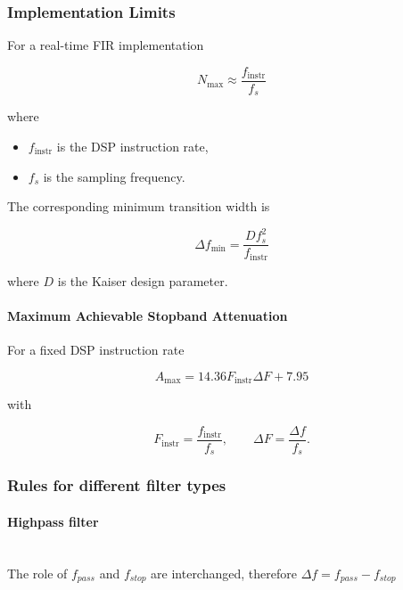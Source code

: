 \subsubsection{Implementation Limits}

For a real-time FIR implementation

\[
N_{\max}
\approx
\frac{f_{\mathrm{instr}}}{f_s}
\]

where

\begin{itemize}
\item $f_{\mathrm{instr}}$ is the DSP instruction rate,
\item $f_s$ is the sampling frequency.
\end{itemize}

The corresponding minimum transition width is

\[
\boxed{
\Delta f_{\min}
=
\frac{Df_s^2}
{f_{\mathrm{instr}}}
}
\]

where $D$ is the Kaiser design parameter.

\paragraph{Maximum Achievable Stopband Attenuation}

For a fixed DSP instruction rate

\[
\boxed{
A_{\max}
=
14.36
F_{\mathrm{instr}}
\Delta F
+
7.95
}
\]

with

\[
F_{\mathrm{instr}}
=
\frac{f_{\mathrm{instr}}}{f_s},
\qquad
\Delta F
=
\frac{\Delta f}{f_s}.
\]

\subsubsection{Rules for different filter types}
\paragraph{Highpass filter}~\\
The role of $f_{pass}$ and $f_{stop}$ are interchanged, therefore $\Delta f = f_{pass}-f_{stop}$

